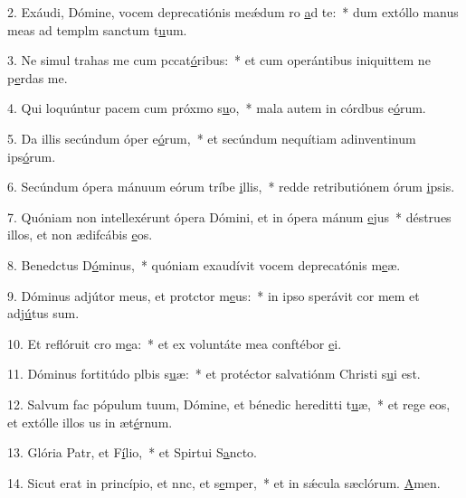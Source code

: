 2. Exáudi, Dómine, vocem deprecatiónis meǽdum ro \uline{a}d te:~* dum extóllo manus meas ad templm sanctum t\uline{u}um.\par 
3. Ne simul trahas me cum pccat\uline{ó}ribus:~* et cum operántibus iniquittem ne p\uline{e}rdas me.\par 
4. Qui loquúntur pacem cum próxmo s\uline{u}o,~* mala autem in córdbus e\uline{ó}rum.\par 
5. Da illis secúndum óper e\uline{ó}rum,~* et secúndum nequítiam adinventinum ips\uline{ó}rum.\par 
6. Secúndum ópera mánuum eórum tríbe \uline{i}llis,~* redde retributiónem órum \uline{i}psis.\par 
7. Quóniam non intellexérunt ópera Dómini, et in ópera mánum \uline{e}jus~* déstrues illos, et non ædifcábis \uline{e}os.\par 
8. Benedctus D\uline{ó}minus,~* quóniam exaudívit vocem deprecatónis m\uline{e}æ.\par 
9. Dóminus adjútor meus, et protctor m\uline{e}us:~* in ipso sperávit cor mem et adj\uline{ú}tus sum.\par 
10. Et reflóruit cro m\uline{e}a:~* et ex voluntáte mea conftébor \uline{e}i.\par 
11. Dóminus fortitúdo plbis s\uline{u}æ:~* et protéctor salvatiónm Christi s\uline{u}i est.\par 
12. Salvum fac pópulum tuum, Dómine, et bénedic hereditti t\uline{u}æ,~* et rege eos, et extólle illos us in æt\uline{é}rnum.\par 
13. Glória Patr, et F\uline{í}lio,~* et Spirtui S\uline{a}ncto.\par 
14. Sicut erat in princípio, et nnc, et s\uline{e}mper,~* et in sǽcula sæclórum. \uline{A}men.\par 
